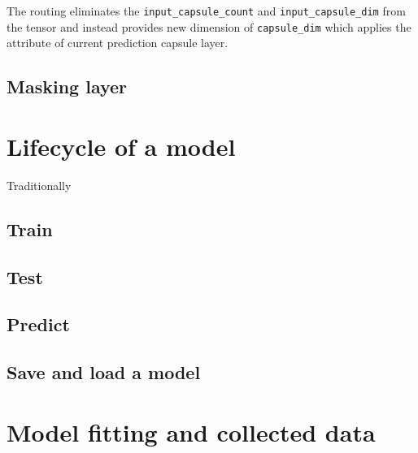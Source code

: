 The routing eliminates the \texttt{input\_capsule\_count} and \texttt{input\_capsule\_dim} from the tensor and instead provides new dimension of \texttt{capsule\_dim} which applies the attribute of current prediction capsule layer.

\subsection{Masking layer}



\section{Lifecycle of a model}

Traditionally

\subsection{Train}




\subsection{Test}



\subsection{Predict}


\subsection{Save and load a model}
\label{ss:save_model}


\section{Model fitting and collected data}


